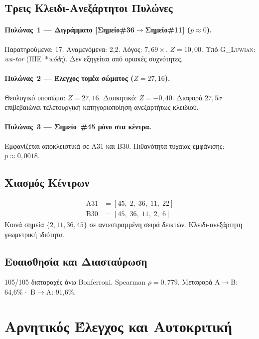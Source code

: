 \documentclass[12pt,a4paper]{article}
\begin{document}
\subsection{Τρεις Κλειδι-Ανεξάρτητοι Πυλώνες}

\paragraph{Πυλώνας~1 --- Διγράμματο [Σημείο\#36$\to$Σημείο\#11] ($p \approx 0$).}
Παρατηρούμενα: 17. Αναμενόμενα: 2,2. Λόγος: $7{,}69\times$. $Z = 10{,}00$. Υπό \textsc{G\_Luwian}: \textit{wa-tar} (ΠΙΕ~*\textit{wódr̥}). Δεν εξηγείται από οριακές συχνότητες.

\paragraph{Πυλώνας~2 --- Έλεγχος τομέα σώματος ($Z=27{,}16$).}
Θεολογικό υποσώμα: $Z = 27{,}16$. Διοικητικό: $Z = -0{,}40$. Διαφορά $27{,}5\sigma$ επιβεβαιώνει τελετουργική κατηγοριοποίηση ανεξαρτήτως κλειδιού.

\paragraph{Πυλώνας~3 --- Σημείο~\#45 μόνο στα κέντρα.}
Εμφανίζεται αποκλειστικά σε A31 και B30. Πιθανότητα τυχαίας εμφάνισης: $p \approx 0{,}0018$.

\subsection{Χιασμός Κέντρων}
\begin{align*}
\text{A31} &= [45,\; 2,\; 36,\; 11,\; 22] \\
\text{B30} &= [45,\; 36,\; 11,\; 2,\; 6]
\end{align*}
Κοινά σημεία $\{2, 11, 36, 45\}$ σε αντεστραμμένη σειρά δεικτών. Κλειδι-ανεξάρτητη γεωμετρική ιδιότητα.

\subsection{Ευαισθησία και Διασταύρωση}
105/105 διαταραχές άνω Bonferroni. Spearman $\rho = 0{,}779$. Μεταφορά Α$\to$Β: 64,6\%· Β$\to$Α: 91,6\%.

\section{Αρνητικός Έλεγχος και Αυτοκριτική}
\end{document}
